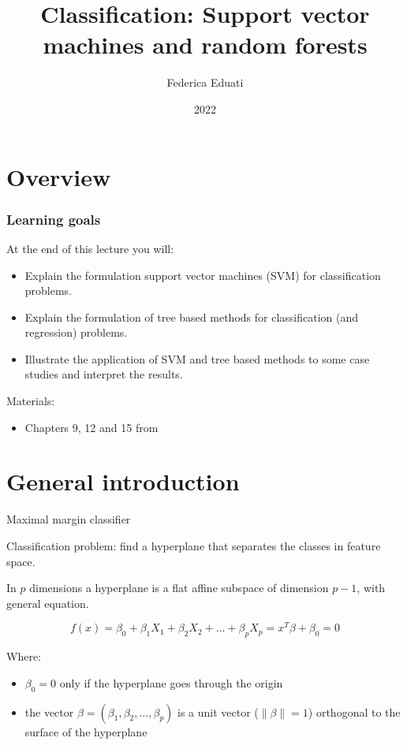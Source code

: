 \documentclass[notes]{beamer}          %
\title{Classification: Support vector machines and random forests}
\author{Federica Eduati}
\institute{Eindhoven University of Technology

Department of Biomedical Engineering}
\date{2022}
\newcommand{\norm}[1]{\left\lVert#1\right\rVert}
\providecommand{\norm}[1]{\lVert#1\rVert}
\begin{document}
 
\frame{\titlepage}
 
\section{Overview}

\begin{frame}
\frametitle{Learning goals}

At the end of this lecture you will:
\begin{itemize}
    \item Explain the formulation support vector machines (SVM) for classification problems.
    \item Explain the formulation of tree based methods for classification (and regression) problems.
    \item Illustrate the application of SVM and tree based methods to some case studies and interpret the results.
\end{itemize}

\vspace{5mm} 

Materials: 
\begin{itemize}
    \item Chapters 9, 12 and 15 from \cite{elements}
\end{itemize}

\end{frame}




\section{General introduction}
\begin{frame}{Maximal margin classifier}

Classification problem: find a hyperplane that separates the classes in feature space.

\vspace{5mm} 

In $p$ dimensions a hyperplane is a flat affine subspace of dimension $p-1$, with general equation.

\begin{equation}
    f(x) = \beta_0 + \beta_1 X_1 + \beta_2 X_2 + \dots + \beta_p X_p = x^T\beta + \beta_0 = 0
\end{equation}

Where:
\begin{itemize}
    \item $\beta_0 = 0$ only if the hyperplane goes through the origin \item the vector $\beta = (\beta_1, \beta_2, \dots, \beta_p)$ is a unit vector ($\norm{\beta} = 1$) orthogonal to the surface of the hyperplane
\end{itemize}
    
\end{frame}
\end{document}
